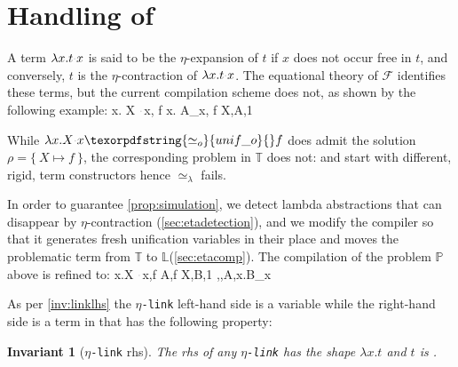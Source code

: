 \documentclass[sigconf,natbib=false,review]{acmart}
\newtheorem{invariant}{Invariant}
\newcommand{\appsep}{\ensuremath{\textcolor{lightgray}{\cdot}}}
\newcommand{\UnifRel}{\ensuremath{\simeq}}
\newcommand{\Uo}{\texorpdfstring{\ensuremath{\UnifRel_o}\xspace}{unif\_o}}
\newcommand{\Ue}{\ensuremath{\UnifRel_\lambda}\xspace}
\newcommand{\linkMacro}[1]{\ensuremath{#1}\texttt{-link}\xspace}
\newcommand{\linketa} {\linkMacro{\eta}}
\newcommand{\Fo}{\texorpdfstring{\ensuremath{\mathcal{F}\xspace}}{F}} %
\newcommand{\rhs}{rhs\xspace}
\newcommand{\linkStore}{\texorpdfstring{\ensuremath{\mathbb{L}}\xspace}{L}}
\newcommand{\foUnifPb}{\ensuremath{\mathbb{P}}\xspace}
\newcommand{\hoUnifPb}{\ensuremath{\mathbb{T}}\xspace}
\begin{document}




\section{Handling of \maybeeta}\label{sec:eta}
A term 
$\lambda x. t \appsep x$ is said to be the $\eta$-expansion of $t$ if
$x$ does not occur free in $t$, and conversely, $t$ is the $\eta$-contraction of
$\lambda x. t \appsep x$. The equational theory of \Fo{} identifies these terms,
but the current compilation scheme does not,
as shown by the following example:
%
\printAlll
  {{{\lambda x. X \appsep x, f}}}
  {{{\lambda x. A_x, f}}}
  {{{X,A,1}}}
  {{}}

\noindent
While $\lambda x.X \appsep x \Uo{} f$ does admit the solution
$\rho = \{~ X \mapsto f ~\}$, the corresponding problem in
\hoUnifPb does not:
 and
 start with different, rigid, term constructors hence
\Ue{} fails.

In order to guarantee \cref{prop:simulation}, we detect
lambda abstractions that can disappear by $\eta$-contraction
(\cref{sec:etadetection}), and we modify the compiler so that it
generates fresh unification variables
in their place and moves the problematic term 
from \hoUnifPb to \linkStore (\cref{sec:etacomp}). The compilation
of the problem \foUnifPb above is refined to: 
%
\printAlll
  {{{\lambda x.X \appsep x,f}}}
  {{{A,f}}}
  {{{X,B,1}}}
  {{{\eta,,A,\lambda x.B_x}}}

\noindent
As per \cref{inv:linklhs} the \linketa left-hand side is a variable
while the right-hand side is a term in \maybeeta that has the following property:

\begin{invariant}[\linketa \rhs]
  The \rhs of any \linketa %
  has the shape $\lambda x.t$
  and $t$ is \wellb. 
  \label{inv:link-eta-right}
\end{invariant}
\end{document}

